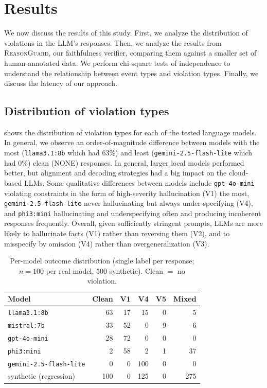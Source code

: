 \documentclass[conference]{IEEEtran}
\newcommand{\rg}{\textsc{ReasonGuard}}
\begin{document}
\section{Results}\label{sec:results}

We now discuss the results of this study. First, we analyze the distribution of violations in the LLM's responses. Then, we analyze the results from \rg{}, our faithfulness verifier, comparing them against a smaller set of human-annotated data. We perform chi-square tests of independence to understand the relationship between event types and violation types. Finally, we discuss the latency of our approach.

\subsection{Distribution of violation types}
 shows the distribution of violation types for each of the tested language models. In general, we observe an order-of-magnitude difference between models with the most (\texttt{llama3.1:8b} which had 63\%) and least (\texttt{gemini-2.5-flash-lite} which had 0\%) clean (NONE) responses. In general, larger local models performed better, but alignment and decoding strategies had a big impact on the cloud-based LLMs. Some qualitative differences between models include \texttt{gpt-4o-mini} violating constraints in the form of high-severity hallucination (V1) the most, \texttt{gemini-2.5-flash-lite} never hallucinating but always under-specifying (V4), and \texttt{phi3:mini} hallucinating and underspecifying often and producing incoherent responses frequently. Overall, given sufficiently stringent prompts, LLMs are more likely to hallucinate facts (V1) rather than reversing them (V2), and to misspecify by omission (V4) rather than overgeneralization (V3).

\begin{table}[t]
\centering
\caption{Per-model outcome distribution (single label per response; $n{=}100$ per real model, $500$ synthetic). Clean $=$ no violation.}
\label{tab:permodel}
\setlength{\tabcolsep}{4pt}
\begin{tabular}{@{}lrrrrr@{}}
\toprule
Model & Clean & V1 & V4 & V5 & Mixed \\
\midrule
\texttt{llama3.1:8b}          & 63 & 17 & 15 & 0 & 5 \\
\texttt{mistral:7b}           & 33 & 52 & 0  & 9 & 6 \\
\texttt{gpt-4o-mini}          & 28 & 72 & 0  & 0 & 0 \\
\texttt{phi3:mini}            & 2  & 58 & 2  & 1 & 37 \\
\texttt{gemini-2.5-flash-lite}& 0  & 0  & 100& 0 & 0 \\
\midrule
synthetic (regression)        & 100& 0  & 125& 0 & 275 \\
\bottomrule
\end{tabular}
\end{table}
\end{document}
